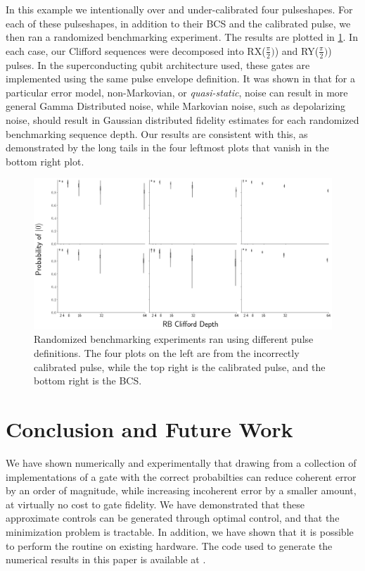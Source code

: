 \documentclass[aps,nofootinbib,pra,notitlepage,twocolumn]{revtex4-1}
\begin{document}
In this example we intentionally over and under-calibrated four pulseshapes. For each of these pulseshapes, in addition to their BCS and the calibrated pulse, we then ran a randomized benchmarking experiment.\cite{Magesan2011} The results are plotted in \ref{fig:rb}. In each case, our Clifford sequences were decomposed into RX($\frac{\pi}{2})$) and RY($\frac{\pi}{2})$) pulses.  In the superconducting qubit architecture used, these gates are implemented using the same pulse envelope definition. It was shown in \cite{Ball2016} that for a particular error model, non-Markovian, or \textit{quasi-static}, noise can result in more general Gamma Distributed noise, while Markovian noise, such as depolarizing noise, should result in Gaussian distributed fidelity estimates for each randomized benchmarking sequence depth. Our results are consistent with this, as demonstrated by the long tails in the four leftmost plots that vanish in the bottom right plot.

\begin{figure}[H]
  \centering
  \includegraphics[width=\columnwidth]{placeholder_rb.png}
  \caption{Randomized benchmarking experiments ran using different pulse definitions. The four plots on the left are from the incorrectly calibrated pulse, while the top right is the calibrated pulse, and the bottom right is the BCS.}
  \label{fig:rb}
\end{figure}

\section{Conclusion and Future Work}
We have shown numerically and experimentally that drawing from a collection of implementations of a gate with the correct probabilties can reduce coherent error by an order of magnitude, while increasing incoherent error by a smaller amount, at virtually no cost to gate fidelity. We have demonstrated that these approximate controls can be generated through optimal control, and that the minimization problem is tractable. In addition, we have shown that it is possible to perform the routine on existing hardware. The code used to generate the numerical results in this paper is available at \cite{decorrelating_errors}.
\end{document}
